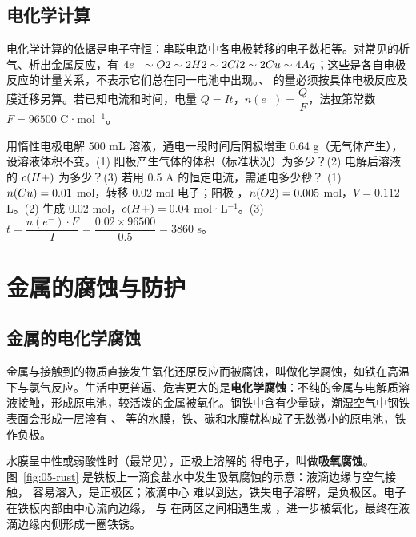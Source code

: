 \subsection{电化学计算}
电化学计算的依据是电子守恒：串联电路中各电极转移的电子数相等。对常见的析气、析出金属反应，有 $4e^-\sim O2\sim2H2\sim2Cl2\sim2Cu\sim4Ag$；这些是各自电极反应的计量关系，不表示它们总在同一电池中出现。、 的量必须按具体电极反应及膜迁移另算。若已知电流和时间，电量 $Q=It$，$n(e^-)=\dfrac{Q}{F}$，法拉第常数 $F=96500$ C·mol$^{-1}$。

\begin{liti}[典型]
用惰性电极电解 500 mL  溶液，通电一段时间后阴极增重 0.64 g（无气体产生），设溶液体积不变。(1) 阳极产生气体的体积（标准状况）为多少？(2) 电解后溶液的 $c(H+)$ 为多少？(3) 若用 0.5 A 的恒定电流，需通电多少秒？
\tcblower
\jie (1) $n(Cu)=0.01$ mol，转移 0.02 mol 电子；阳极 ，$n(O2)=0.005$ mol，$V=0.112$ L。(2) 生成  0.02 mol，$c(H+)=0.04$ mol·L$^{-1}$。(3) $t=\dfrac{n(e^-)\cdot F}{I}=\dfrac{0.02\times96500}{0.5}=3860$ s。
\end{liti}

\section{金属的腐蚀与防护}

\subsection{金属的电化学腐蚀}
金属与接触到的物质直接发生氧化还原反应而被腐蚀，叫做化学腐蚀，如铁在高温下与氯气反应。生活中更普遍、危害更大的是\textbf{电化学腐蚀}：不纯的金属与电解质溶液接触，形成原电池，较活泼的金属被氧化。钢铁中含有少量碳，潮湿空气中钢铁表面会形成一层溶有 、 等的水膜，铁、碳和水膜就构成了无数微小的原电池，铁作负极。

水膜呈中性或弱酸性时（最常见），正极上溶解的  得电子，叫做\textbf{吸氧腐蚀}。图~\ref{fig:05-rust} 是铁板上一滴食盐水中发生吸氧腐蚀的示意：液滴边缘与空气接触， 容易溶入，是正极区；液滴中心  难以到达，铁失电子溶解，是负极区。电子在铁板内部由中心流向边缘， 与  在两区之间相遇生成 ，进一步被氧化，最终在液滴边缘内侧形成一圈铁锈。

